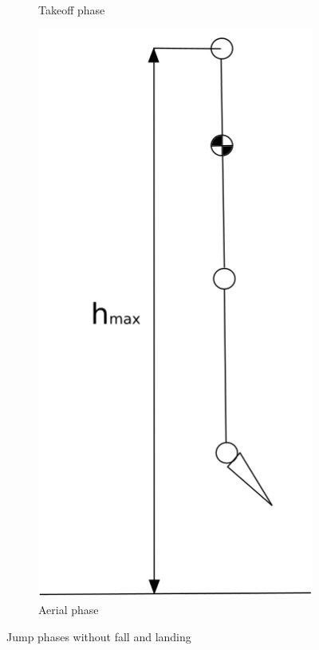 \begin{figure}[ht!]
\begin{subfigure}[b]{0.3\textwidth}
        \caption{Takeoff phase}
        \label{fig:takeoff_phase}
    \end{subfigure}
    \begin{subfigure}[b]{0.3\textwidth}
        \includegraphics[width=\textwidth]{figures/flight_phase.png}
        \caption{Aerial phase}
        \label{fig:aerial_phase}
    \end{subfigure}
    \caption{Jump phases without fall and landing}
    \label{fig:jump_phases}
\end{figure}



